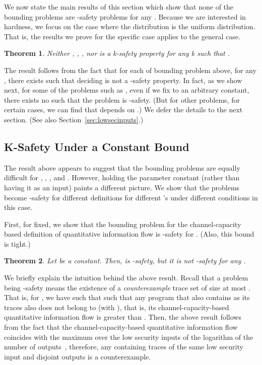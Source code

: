 \documentclass{llncs}
\newtheorem{theorem}{Theorem}[section]
\begin{document}
We now state the main results of this section which show that none of
the bounding problems are -safety problems for any .  Because we
are interested in hardness, we focus on the case where the
distribution is the uniform distribution.  That is, the results we
prove for the specific case applies to the general case.
\begin{theorem}
Neither , , , nor  is a k-safety property for any k such that .
\label{thm:senk2}
\end{theorem}
The result follows from the fact that for each of bounding
  problem  above, for any , there exists  such
  that deciding  is not a -safety
  property.  In fact, as we show next, for some of the problems such
  as , even if we fix  to an arbitrary constant,
  there exists no  such that the problem is -safety.  (But for
  other problems, for certain cases, we can find  that depends on
  .)  We defer the details to the next section.  (See also
  Section~\ref{sec:lowsecinputs}.)
\subsection{K-Safety Under a Constant Bound}

\label{sec:ksafetyconst}

The result above appears to suggest that the bounding problems are
equally difficult for , , , and
.  However, holding the parameter  constant (rather than having
it as an input) paints a different picture.  We show that the problems
become -safety for different definitions for different 's under
different conditions in this case.

First, for  fixed, we show that the bounding problem for the
channel-capacity based definition of quantitative information flow is
-safety for .  (Also, this bound is
tight.)
\begin{theorem}
\label{thm:cck}
Let  be a constant.  Then,  is
-safety, but it is not -safety for any .
\end{theorem}

We briefly explain the intuition behind the above result. Recall that
a problem being -safety means the existence of a {\em
  counterexample} trace set of size at most .  That is, for , we have  such that  such that any program that also contains 
as its traces also does not belong to  (with ), that
is, its channel-capacity-based quantitative information flow is
greater than .  Then, the above result follows from the fact that
the channel-capacity-based quantitative information flow coincides
with the maximum over the low security inputs of the logarithm of the
number of outputs~\cite{malacaria08}, therefore, any  containing
 traces of the same low security input and
disjoint outputs is a counterexample.
\end{document}
